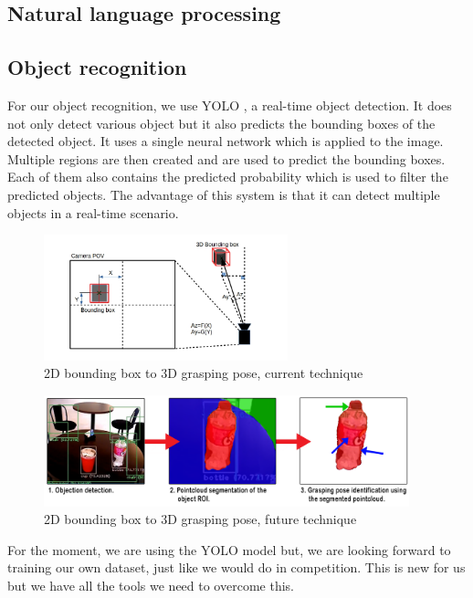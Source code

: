 \documentclass[runningheads,a4paper]{llncs}
\begin{document}
\subsection{Natural language processing}
\tab 


\subsection{Object recognition}
\tab For our object recognition, we use YOLO \cite{yolo}, a real-time object detection. It does not only detect various object but it also predicts the bounding boxes of the detected object. It uses a single neural network which is applied to the image. Multiple regions are then created and are used to predict the bounding boxes. Each of them also contains the predicted probability which is used to filter the predicted objects. The advantage of this system is that it can detect multiple objects in a real-time scenario.\\
 
\begin{figure}
  \centering
  \includegraphics[width=200pt]{images/frame_to_box.png}
  \caption{2D bounding box to 3D grasping pose, current technique}
\end{figure} 
 


\begin{figure}
  \centering
  \includegraphics[width=300pt]{images/frame_to_box2.png}
  \caption{2D bounding box to 3D grasping pose, future technique}
\end{figure}

For the moment, we are using the YOLO model but, we are looking forward to training our own dataset, just like we would do in competition. This is new for us but we have all the tools we need to overcome this. \\
\end{document}
